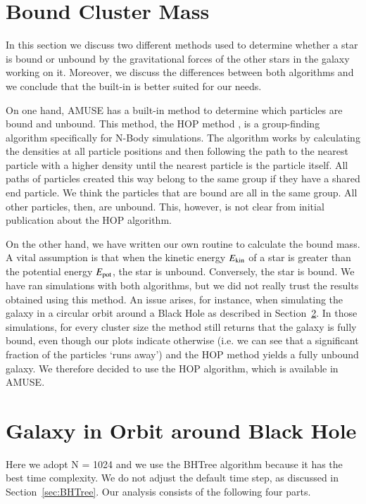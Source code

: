 \documentclass{aa}
\begin{document}
\section{Bound Cluster Mass} \label{sec:BoundClusterMass}
In this section we discuss two different methods used to determine whether a star is bound or unbound by the gravitational forces of the other stars in the galaxy working on it. Moreover, we discuss the differences between both algorithms and we conclude that the built-in is better suited for our needs.

On one hand, AMUSE has a built-in method to determine which particles are bound and unbound. This method, the HOP method \citep{1998ApJ...498..137E}, is a group-finding algorithm specifically for N-Body simulations. The algorithm works by calculating the densities at all particle positions and then following the path to the nearest particle with a higher density until the nearest particle is the particle itself. All paths of particles created this way belong to the same group if they have a shared end particle. We think the particles that are bound are all in the same group. All other particles, then, are unbound. This, however, is not clear from initial publication about the HOP algorithm.

On the other hand, we have written our own routine to calculate the bound mass. A vital assumption is that when the kinetic energy $E_{\rm kin}$ of a star is greater than the potential energy $E_{\rm pot}$, the star is unbound. Conversely, the star is bound. We have ran simulations with both algorithms, but we did not really trust the results obtained using this method. An issue arises, for instance, when simulating the galaxy in a circular orbit around a Black Hole as described in Section~\ref{sec:orbitBH_MW_Mass}. In those simulations, for every cluster size the method still returns that the galaxy is fully bound, even though our plots indicate otherwise (i.e. we can see that a significant fraction of the particles `runs away') and the HOP method yields a fully unbound galaxy. We therefore decided to use the HOP algorithm, which is available in AMUSE.
  
\section{Galaxy in Orbit around Black Hole} \label{sec:orbitBH_MW_Mass}
Here we adopt N = 1024 and we use the BHTree algorithm because it has the best time complexity. We do not adjust the default time step, as discussed in Section~\ref{sec:BHTree}. Our analysis consists of the following four parts. 
\end{document}

